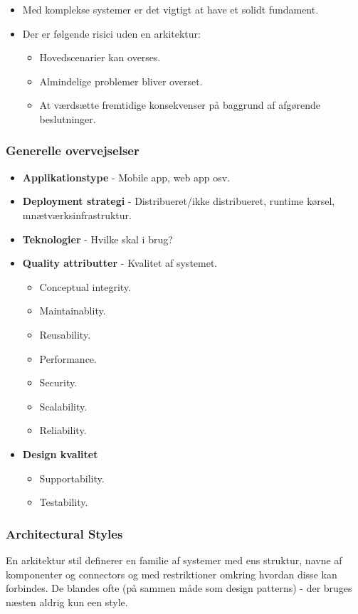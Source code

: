 \begin{itemize}
	\item Med komplekse systemer er det vigtigt at have et solidt fundament.
	\item Der er følgende risici uden en arkitektur:
	\begin{itemize}
		\item Hovedscenarier kan overses.
		\item Almindelige problemer bliver overset.
		\item At værdsætte fremtidige konsekvenser på baggrund af afgørende beslutninger.
	\end{itemize}
\end{itemize}

\subsubsection{Generelle overvejselser}
\begin{itemize}
	\item \textbf{Applikationstype} - Mobile app, web app osv.
	\item \textbf{Deployment strategi} - Distribueret/ikke distribueret, runtime kørsel, mnætværksinfrastruktur.
	\item \textbf{Teknologier} - Hvilke skal i brug?
	\item \textbf{Quality attributter} - Kvalitet af systemet.
	\begin{itemize}
		\item Conceptual integrity.
		\item Maintainablity.
		\item Reusability.
		\item Performance.
		\item Security.
		\item Scalability.
		\item Reliability.
	\end{itemize}
	\item \textbf{Design kvalitet}
	\begin{itemize}
		\item Supportability.
		\item Testability.
	\end{itemize}
\end{itemize}

\subsubsection{Architectural Styles}
En arkitektur stil definerer en familie af systemer med ens struktur, navne af komponenter og connectors og med restriktioner omkring hvordan disse kan forbindes. De blandes ofte (på sammen måde som design patterns) - der bruges næsten aldrig kun een style.

